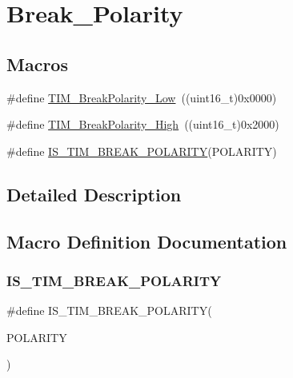 \hypertarget{group___break___polarity}{}\section{Break\+\_\+\+Polarity}
\label{group___break___polarity}
\subsection*{Macros}
\begin{DoxyCompactItemize}
\item 
\#define \mbox{\hyperlink{group___break___polarity_ga565656ca81d17f9a1807afe3971dff6e}{T\+I\+M\+\_\+\+Break\+Polarity\+\_\+\+Low}}~((uint16\+\_\+t)0x0000)
\item 
\#define \mbox{\hyperlink{group___break___polarity_gabd4b72079548fd8903413a348539542b}{T\+I\+M\+\_\+\+Break\+Polarity\+\_\+\+High}}~((uint16\+\_\+t)0x2000)
\item 
\#define \mbox{\hyperlink{group___break___polarity_gaa29e33e74c5ff10972357ddd3f47f078}{I\+S\+\_\+\+T\+I\+M\+\_\+\+B\+R\+E\+A\+K\+\_\+\+P\+O\+L\+A\+R\+I\+TY}}(P\+O\+L\+A\+R\+I\+TY)
\end{DoxyCompactItemize}


\subsection{Detailed Description}


\subsection{Macro Definition Documentation}
\mbox{\label{group___break___polarity_gaa29e33e74c5ff10972357ddd3f47f078}} 
\subsubsection{\texorpdfstring{IS\_TIM\_BREAK\_POLARITY}{IS\_TIM\_BREAK\_POLARITY}}
{\footnotesize\ttfamily \#define I\+S\+\_\+\+T\+I\+M\+\_\+\+B\+R\+E\+A\+K\+\_\+\+P\+O\+L\+A\+R\+I\+TY(\begin{DoxyParamCaption}\item[{}]{P\+O\+L\+A\+R\+I\+TY }\end{DoxyParamCaption})}

